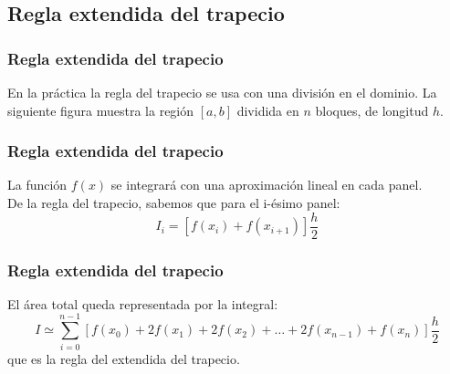 \subsection{Regla extendida del trapecio}
\begin{frame}
\frametitle{Regla extendida del trapecio}
En la práctica la regla del trapecio se usa con una división en el dominio. La siguiente figura muestra la región $[a,b]$ dividida en $n$ bloques, de longitud $h$.
\begin{figure}
	\centering
	
\end{figure}
\end{frame}
\begin{frame}
\frametitle{Regla extendida del trapecio}
La función $f(x)$ se integrará con una aproximación lineal en cada panel. 
\\
\bigskip
De la regla del trapecio, sabemos que para el i-ésimo panel:
\[ I_{i} = [ f(x_{i}) + f(x_{i+1}) ] \dfrac{h}{2}\]
\end{frame}
\begin{frame}
\frametitle{Regla extendida del trapecio}
El área total queda representada por la integral:
\fontsize{12}{12}\selectfont
\[ I \simeq \sum_{i=0}^{n-1} [f(x_{0}) + 2f(x_{1}) + 2f(x_{2}) + \ldots +2 f(x_{n-1}) + f(x_{n})] \dfrac{h}{2}\]
\fontsize{14}{14}\selectfont
que es la regla del extendida del trapecio.
\end{frame}

